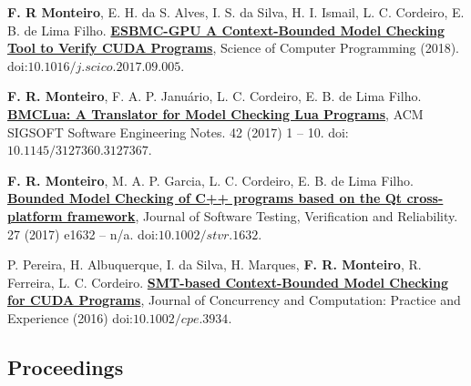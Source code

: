 \documentclass[letterpaper]{article}
\renewenvironment{itemize}{
  \begin{list}{}{
    \setlength{\leftmargin}{1.5em}
  }
}{
  \end{list}
}
\begin{document}
\begin{itemize}
\item {\bf F. R Monteiro}, E. H. da S. Alves, I. S. da Silva, H. I. Ismail, L. C. Cordeiro, E. B. de Lima Filho. \href{http://www.sciencedirect.com/science/article/pii/S0167642317301934}{{\bf ESBMC-GPU A Context-Bounded Model Checking Tool to Verify CUDA Programs}}, Science of Computer Programming (2018). doi:$10.1016/j.scico.2017.09.005$.

\item {\bf F. R. Monteiro}, F. A. P. Janu\'{a}rio, L. C. Cordeiro, E. B. de Lima Filho. \href{https://dl.acm.org/citation.cfm?id=3127367}{{\bf BMCLua: A Translator for Model Checking Lua Programs}}, ACM SIGSOFT Software Engineering Notes. 42 (2017) 1 -- 10. doi:$10.1145/3127360.3127367$.

\item {\bf F. R. Monteiro}, M. A. P. Garcia, L. C. Cordeiro, E. B. de Lima Filho. \href{http://onlinelibrary.wiley.com/doi/10.1002/stvr.1632/full}{{\bf Bounded Model Checking of C++ programs based on the Qt cross-platform framework}}, Journal of Software Testing, Verification and Reliability. 27 (2017) e1632 -- n/a. doi:$10.1002/stvr.1632$.

\item P. Pereira, H. Albuquerque, I. da Silva, H. Marques, {\bf F. R. Monteiro}, R. Ferreira, L. C. Cordeiro. \href{http://onlinelibrary.wiley.com/doi/10.1002/cpe.3934/full}{{\bf SMT-based Context-Bounded Model Checking for CUDA Programs}}, Journal of Concurrency and Computation: Practice and Experience (2016) doi:$10.1002/cpe.3934$.

\end{itemize}

\subsection*{Proceedings}
\end{document}
